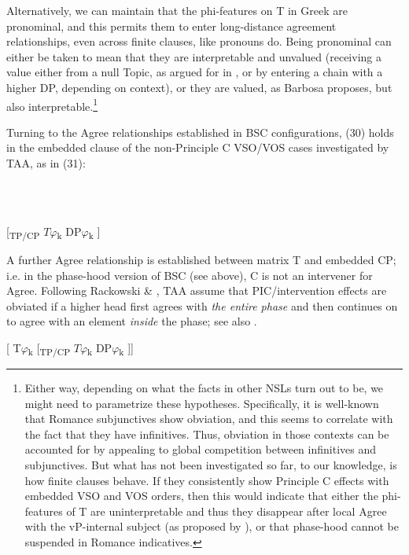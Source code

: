 \documentclass[output=paper]{langsci/langscibook}
\begin{document}
Alternatively, we can maintain that the phi-features on T in Greek are pronominal, and this permits them to enter long-distance agreement relationships, even across finite clauses, like pronouns do. Being pronominal can either be taken to mean that they are interpretable and unvalued (receiving a value either from a null Topic, as argued for in \citealt{Frascarelli2007}, or by entering a chain with a higher DP, depending on context), or they are valued, as Barbosa proposes, but also interpretable.\footnote{Either way, depending on what the facts in other NSLs turn out to be, we might need to parametrize these hypotheses. Specifically, it is well-known that Romance subjunctives show obviation, and this seems to correlate with the fact that they have infinitives. Thus, obviation in those contexts can be accounted for by appealing to global competition between infinitives and subjunctives. But what has not been investigated so far, to our knowledge, is how finite clauses behave. If they consistently show Principle C effects with embedded VSO and VOS orders, then this would indicate that either the phi-features of T are uninterpretable and thus they disappear after local Agree with the vP-internal subject (as proposed by \citealt{Barbosa2009}), or that phase-hood cannot be suspended in Romance indicatives.} 

Turning to the Agree relationships established in BSC configurations, (30) holds in the embedded clause of the non-Principle C VSO/VOS cases investigated by TAA, as in (31):

\ea%
    \label{ex:key:31}
    \gll\\
        \\
    \glt
    \z

          \textsubscript{} [\textsubscript{TP/CP}    $T\varphi $\textsubscript{k}    DP$\varphi $\textsubscript{k}  ]  

A further Agree relationship is established between matrix T and embedded CP; i.e. in the phase-hood version of BSC (see above), C is not an intervener for Agree. Following Rackowski \& \citet{Richards2005}, TAA assume that PIC/intervention effects are obviated if a higher head first agrees with \textit{the entire phase} and then continues on to agree with an element \textit{inside} the phase; see also \citet{Halpert2016}. 

 [   T$\varphi $\textsubscript{k} [\textsubscript{TP/CP}    $T\varphi $\textsubscript{k}    DP$\varphi $\textsubscript{k}  ]]      
\end{document}
